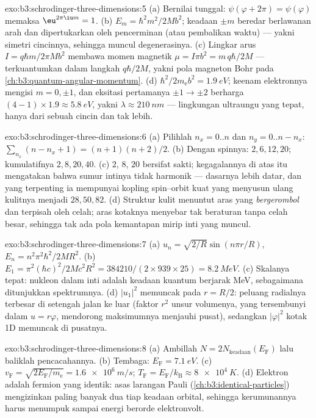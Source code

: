 \begin{solution}{exo:b3:schrodinger-three-dimensions:5}
(a) Bernilai tunggal: $\psi(\varphi + 2\pi) = \psi(\varphi)$ memaksa
$\eu^{2\pi\iu m} = 1$. (b) $E_m = \hbar^2m^2/2Mb^2$; keadaan $\pm
m$ beredar berlawanan arah dan dipertukarkan oleh pencerminan (atau
pembalikan waktu) --- yakni simetri cincinnya, sehingga muncul
degenerasinya. (c)
Lingkar arus $I = q\hbar m/2\pi Mb^2$ membawa momen magnetik
$\mu = I\pi b^2 = m\,q\hbar/2M$ --- terkuantumkan dalam langkah $q\hbar/2M$,
yakni pola magneton Bohr pada \cref{ch:b3:quantum-angular-momentum}.
(d) $\hbar^2/2m_{\text{e}}b^2 = \qty{1.9}{eV}$; keenam elektronnya
mengisi $m = 0, \pm1$, dan eksitasi pertamanya $\pm1 \to \pm2$ berharga
$(4-1) \times 1.9 \approx \qty{5.8}{eV}$, yakni $\lambda \approx
\qty{210}{nm}$ --- lingkungan ultraungu yang tepat, hanya dari sebuah
cincin dan tak lebih.
\end{solution}

\begin{solution}{exo:b3:schrodinger-three-dimensions:6}
(a) Pilihlah $n_x = 0..n$ dan $n_y = 0..n - n_x$: $\sum_{n_x}(n - n_x
+ 1) = (n+1)(n+2)/2$. (b) Dengan spinnya: $2, 6, 12, 20$; kumulatifnya $2,
8, 20, 40$. (c) $2$, $8$, $20$ bersifat sakti; kegagalannya di atas itu
mengatakan bahwa sumur intinya tidak harmonik --- dasarnya lebih datar,
dan yang terpenting ia mempunyai kopling spin--orbit kuat yang menyusun
ulang kulitnya menjadi $28, 50, 82$. (d) Struktur kulit menuntut aras
yang \emph{bergerombol} dan terpisah oleh celah; aras kotaknya menyebar
tak beraturan tanpa celah besar, sehingga tak ada pola kemantapan mirip
inti yang muncul.
\end{solution}

\begin{solution}{exo:b3:schrodinger-three-dimensions:7}
(a) $u_n = \sqrt{2/R}\sin(n\pi r/R)$, $E_n = n^2\pi^2\hbar^2/2MR^2$.
(b) $E_1 = \pi^2(\hbar c)^2/2Mc^2R^2 = 384210/(2 \times 939 \times
25) = \qty{8.2}{MeV}$. (c) Skalanya tepat: nukleon dalam inti adalah
keadaan kuantum berjarak MeV, sebagaimana ditunjukkan spektrumnya. (d)
$|u_1|^2$ memuncak pada $r = R/2$: peluang radialnya terbesar di
setengah jalan ke luar (faktor $r^2$ unsur volumenya, yang tersembunyi
dalam $u = r\varphi$, mendorong maksimumnya menjauhi pusat), sedangkan
$|\varphi|^2$ kotak 1D memuncak di pusatnya.
\end{solution}

\begin{solution}{exo:b3:schrodinger-three-dimensions:8}
(a) Ambillah $N = 2N_{\text{keadaan}}(E_{\text{F}})$ lalu baliklah
pencacahannya.
(b) Tembaga: $E_{\text{F}} = \qty{7.1}{eV}$. (c) $v_{\text{F}} =
\sqrt{2E_{\text{F}}/m_{\text{e}}} = \qty{1.6e6}{m/s}$;
$T_{\text{F}} = E_{\text{F}}/k_{\text{B}} \approx \qty{8e4}{K}$. (d)
Elektron adalah fermion yang identik: asas larangan Pauli
(\cref{ch:b3:identical-particles}) mengizinkan paling banyak dua tiap
keadaan orbital, sehingga kerumunannya harus menumpuk sampai energi
berorde elektronvolt.
\end{solution}

